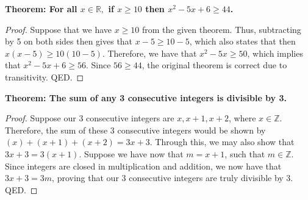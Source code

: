 \begin{example}
    \textbf{Theorem: For all $x \in \mathbb{R},$ if $x \geq 10$ then $x^2-5x+6 \geq 44$.}
\end{example}

\begin{proof}
    Suppose that we have $x \geq 10$ from the given theorem. Thus, subtracting by 5 on both sides then gives that $x-5 \geq 10-5$, which also states that then $x(x-5)\geq 10(10-5).$ Therefore, we have that $x^2-5x\geq 50$, which implies that $x^2-5x+6 \geq 56$. Since $56 \geq  44$, the original theorem is correct due to transitivity. QED.
\end{proof}

\begin{example}
    \textbf{Theorem: The sum of any 3 consecutive integers is divisible by 3.}
\end{example}

\begin{proof}
    Suppose our 3 consecutive integers are $x, x+1, x+2$, where $x \in \mathbb{Z}$. Therefore, the sum of these 3 consecutive integers would be shown by $(x)+(x+1)+(x+2)=3x+3$. Through this, we may also show that $3x+3=3(x+1)$. Suppose we have now that $m=x+1$, such that $m \in \mathbb{Z}$. Since integers are closed in multiplication and addition, we now have that $3x+3=3m$, proving that our 3 consecutive integers are truly divisible by 3. QED.
\end{proof}